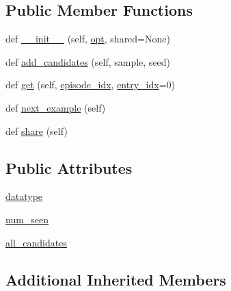 \subsection*{Public Member Functions}
\begin{DoxyCompactItemize}
\item 
def \hyperlink{classparlai_1_1tasks_1_1ubuntu_1_1agents_1_1UbuntuTeacherWithNegs_a10a49844810d11e7aecf4b7854c81787}{\+\_\+\+\_\+init\+\_\+\+\_\+} (self, \hyperlink{classparlai_1_1core_1_1agents_1_1Teacher_a3ce6243860ce978a897922863ed32fa4}{opt}, shared=None)
\item 
def \hyperlink{classparlai_1_1tasks_1_1ubuntu_1_1agents_1_1UbuntuTeacherWithNegs_aca16cfaf6d38cfc93ace8445811863c3}{add\+\_\+candidates} (self, sample, seed)
\item 
def \hyperlink{classparlai_1_1tasks_1_1ubuntu_1_1agents_1_1UbuntuTeacherWithNegs_a47304c2339835e7942ae190d4b17fc2d}{get} (self, \hyperlink{classparlai_1_1core_1_1teachers_1_1FixedDialogTeacher_afd4ebab8063eb42d182d30a1a41f133e}{episode\+\_\+idx}, \hyperlink{classparlai_1_1core_1_1teachers_1_1FixedDialogTeacher_ae3201b15f3c3b46a2f3511bad9b43e7d}{entry\+\_\+idx}=0)
\item 
def \hyperlink{classparlai_1_1tasks_1_1ubuntu_1_1agents_1_1UbuntuTeacherWithNegs_aef77d69155c1215eb64ec5c1ba895bdf}{next\+\_\+example} (self)
\item 
def \hyperlink{classparlai_1_1tasks_1_1ubuntu_1_1agents_1_1UbuntuTeacherWithNegs_aacac8ac1f8b79287b943b85ed21b081b}{share} (self)
\end{DoxyCompactItemize}
\subsection*{Public Attributes}
\begin{DoxyCompactItemize}
\item 
\hyperlink{classparlai_1_1tasks_1_1ubuntu_1_1agents_1_1UbuntuTeacherWithNegs_a93d31fab305d4b58d377ea9e6d5b7e39}{datatype}
\item 
\hyperlink{classparlai_1_1tasks_1_1ubuntu_1_1agents_1_1UbuntuTeacherWithNegs_a66c8920874a95611d27a7d5b21c1c128}{num\+\_\+seen}
\item 
\hyperlink{classparlai_1_1tasks_1_1ubuntu_1_1agents_1_1UbuntuTeacherWithNegs_ab4625f39fc5003fb1ea94be95c8e8ef9}{all\+\_\+candidates}
\end{DoxyCompactItemize}
\subsection*{Additional Inherited Members}


